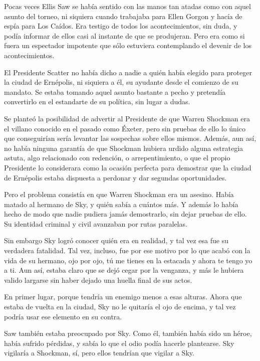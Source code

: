 \parbreak
Pocas veces Ellis Saw se había sentido con las manos tan atadas como con aquel asunto del torneo, ni siquiera cuando trabajaba para Ellen Gorgon y hacía de espía para Los Caídos. Era testigo de todos los acontecimientos, sin duda, y podía informar de ellos casi al instante de que se produjeran. Pero era como si fuera un espectador impotente que sólo estuviera contemplando el devenir de los acontecimientos.

El Presidente Scatter no había dicho a nadie a quién había elegido para proteger la ciudad de Ernépolis, ni siquiera a él, su ayudante desde el comienzo de su mandato. Se estaba tomando aquel asunto bastante a pecho y pretendía convertirlo en el estandarte de su política, sin lugar a dudas.

Se planteó la posibilidad de advertir al Presidente de que Warren Shockman era el villano conocido en el pasado como Éxeter, pero sin pruebas de ello lo único que conseguirían sería levantar las sospechas sobre ellos mismos. Además, aun así, no había ninguna garantía de que Shockman hubiera urdido alguna estrategia astuta, algo relacionado con redención, o arrepentimiento, o que el propio Presidente lo considerara como la ocasión perfecta para demostrar que la ciudad de Ernépolis estaba dispuesta a perdonar y dar segundas oportunidades.

Pero el problema consistía en que Warren Shockman era un asesino. Había matado al hermano de Sky, y quién sabía a cuántos más. Y además lo había hecho de modo que nadie pudiera jamás demostrarlo, sin dejar pruebas de ello. Su identidad criminal y civil avanzaban por rutas paralelas.

Sin embargo Sky logró conocer quién era en realidad, y tal vez esa fue su verdadera fatalidad. Tal vez, incluso, fue por ese motivo por lo que acabó con la vida de su hermano, ojo por ojo, tú me tienes en la estacada y ahora te tengo yo a ti. Aun así, estaba claro que se dejó cegar por la venganza, y más le hubiera valido largarse sin haber dejado una huella final de sus actos.

En primer lugar, porque tendría un enemigo menos a esas alturas. Ahora que estaba de vuelta en la ciudad, Sky no le quitaría el ojo de encima, y tal vez podría usar ese elemento en su contra.

Saw también estaba preocupado por Sky. Como él, también había sido un héroe, había sufrido pérdidas, y sabía lo que el odio podía hacerle plantearse. Sky vigilaría a Shockman, sí, pero ellos tendrían que vigilar a Sky.

